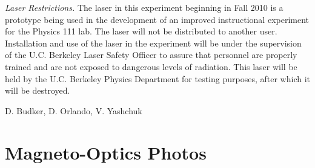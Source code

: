 \documentclass{../lab}
\begin{document}
\emph{Laser Restrictions.} The laser in this experiment beginning in Fall 2010 is a prototype being used in the development of an improved instructional experiment for the Physics 111 lab. The laser will not be distributed to another user. Installation and use of the laser in the experiment will be under the supervision of the U.C. Berkeley Laser Safety Officer to assure that personnel are properly trained and are not exposed to dangerous levels of radiation. This laser will be held by the U.C. Berkeley Physics Department for testing purposes, after which it will be destroyed.

D. Budker, D. Orlando, V. Yashchuk

\section{Magneto-Optics Photos}
\end{document}
